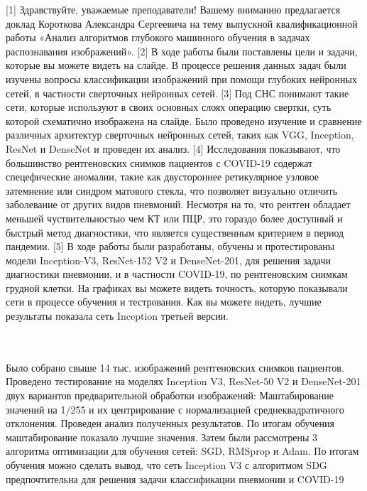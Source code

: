 [1]
Здравствуйте, уважаемые преподаватели!
Вашему вниманию предлагается доклад Короткова Александра Сергеевича на тему выпускной квалификационной работы «Анализ алгоритмов глубокого машинного обучения  в задачах распознавания изображений».
[2]
В ходе работы были поставлены цели и задачи, которые вы можете видеть на слайде.
В процессе решения данных задач были изучены вопросы классификации изображений при помощи глубоких нейронных сетей, в частности сверточных нейронных сетей. 
[3]
Под СНС понимают такие сети, которые используют в своих основных слоях операцию свертки, суть которой схематично изображена на слайде. Было проведено изучение и сравнение различных архитектур сверточных нейронных сетей, таких как VGG, Inception, ResNet и DenseNet и проведен их анализ.   
[4]
Исследования показывают, что большинство рентгеновских снимков пациентов с COVID-19 содержат спецефические аномалии, такие как двустороннее ретикулярное узловое затемнение или синдром матового стекла, что позволяет визуально отличить заболевание от других видов пневмоний. Несмотря на то, что рентген обладает меньшей чуствительностью чем КТ или ПЦР, это гораздо более доступный и быстрый метод диагностики, что является существенным критерием в период пандемии.
[5]
В ходе работы были разработаны, обучены и протестированы модели Inception-V3, ResNet-152 V2 и DenseNet-201, для решения задачи диагностики пневмонии, и в частности COVID-19, по рентгеновским снимкам грудной клетки. На графиках вы можете видеть точность, которую показывали сети в процессе обучения и тестрования. Как вы можете видеть, лучшие результаты показала сеть Inception третьей версии.



\\\\
Было собрано свыше 14 тыс. изображений рентгеновских снимков пациентов. Проведено тестирование на моделях Inception V3, ResNet­-50 V2 и DenseNet-201 двух вариантов предварительной обработки изображений: Маштабирование значений на 1/255 и их центрирование с нормализацией среднеквадратичного отклонения. Проведен анализ полученных результатов. По итогам обучения маштабирование показало лучшие значения. 
Затем были рассмотрены 3 алгоритма оптимизации для обучения сетей: SGD, RMSprop и Adam. По итогам обучения можно сделать вывод, что сеть Inception V3 с алгоритмом SDG предпочтительна для решения задачи классификации пневмонии и COVID-19
